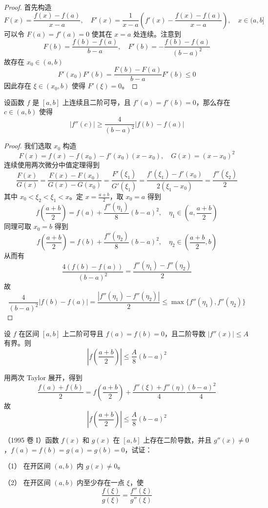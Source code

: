 \begin{proof}
	首先构造
	\[ F(x) = \frac{f(x) - f(a)}{x - a}, \quad F'(x) = \frac{1}{x-a} \left(f'(x) - \frac{f(x) - f(a)}{x-a}\right), \quad x \in (a, b] \]
	可以令 $F(a) = f'(a) = 0$ 使其在 $x=a$ 处连续。注意到
	\[ F(b) = \frac{f(b) - f(a)}{b-a}, \quad F'(b) = -\frac{f(b) - f(a)}{(b-a)^2} \]
	故存在 $x_0 \in (a, b)$
	\[ F'(x_0) F'(b) = \frac{F(b) - F(a)}{b - a} F'(b) \leqslant 0 \]
	因此存在 $\xi \in (x_0, b)$ 使得 $F'(\xi) = 0$。
\end{proof}

\begin{problem}[000042]
设函数 $f$ 是 $[a,b]$ 上连续且二阶可导，且 $f'(a) = f'(b) = 0$，那么存在 $c \in (a,b)$ 使得
\[ |f''(c)| \geqslant \frac{4}{(b-a)^2} |f(b) - f(a)| \]
\end{problem}

\begin{proof}
	我们选取 $x_0$ 构造
	\[ F(x) = f(x) - f(x_0) - f'(x_0)(x-x_0) , \quad G(x) = (x-x_0)^2 \]
	连续使用两次微分中值定理得到
	\[ \frac{F(x)}{G(x)} = \frac{F(x) - F(x_0)}{G(x) - G(x_0)} = \frac{F'(\xi_1)}{G'(\xi_1)} = \frac{f'(\xi_1) - f'(x_0)}{2 (\xi_1 - x_0)} = \frac{f''(\xi_2)}{2} \]
	其中 $x_0 < \xi_2 < \xi_1 < x$。定 $x=\frac{a+b}{2}$，取 $x_0 = a$ 得到
	\[ f\left(\frac{a+b}{2}\right) = f(a) + \frac{f''(\eta_1)}{8} (b-a)^2, \quad \eta_1 \in \left(a, \frac{a+b}{2}\right) \]
	同理可取 $x_0 = b$ 得到
	\[ f\left(\frac{a+b}{2}\right) = f(b) + \frac{f''(\eta_2)}{8} (b-a)^2, \quad \eta_2 \in \left(\frac{a+b}{2}, b\right) \]
	从而有
	\[ \frac{4(f(b) - f(a))}{(b-a)^2} = \frac{f''(\eta_1) - f''(\eta_2)}{2} \]
	故
	\[ \frac{4}{(b-a)^2}|f(b) - f(a)| = \frac{|f''(\eta_1) - f''(\eta_2)|}{2} \leqslant \max\{f''(\eta_1), f''(\eta_2)\} \]
\end{proof}

\begin{problem}[000043]
设 $f$ 在区间 $[a, b]$ 上二阶可导且 $f(a) = f(b) = 0$，且二阶导数 $|f''(x)| \leqslant A$ 有界。则
\[ \left| f\left(\frac{a+b}{2}\right) \right| \leqslant \frac{A}{8}(b- a)^2 \]
\end{problem}

\begin{solution}
	用两次 Taylor 展开，得到
	\[ \frac{f(a) + f(b)}{2} = f\left(\frac{a+b}{2}\right) + \frac{f''(\xi) + f''(\eta)}{4}\frac{(b - a)^2}{4} \]
	故
	\[ \left| f\left(\frac{a+b}{2}\right) \right| \leqslant \frac{A}{8}(b- a)^2 \]
\end{solution}

\begin{problem}[000064]
（1995 卷 I）函数 $f(x)$ 和 $g(x)$ 在 $[a,b]$ 上存在二阶导数，并且 $g''(x) \neq 0$，$f(a) = f(b) = g(a) = g(b) = 0$，试证：

（1） 在开区间 $(a, b)$ 内 $g(x) \neq 0$。

（2） 在开区间 $(a, b)$ 内至少存在一点 $\xi$，使
\[ \frac{f(\xi)}{g(\xi)} = \frac{f''(\xi)}{g''(\xi)} \]
\end{problem}

